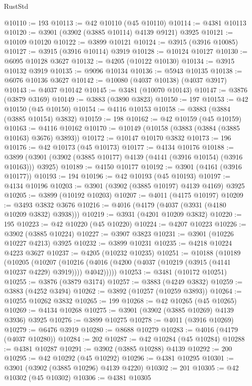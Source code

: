 \begin{lexlean}{RustStd}
\begin{coremodule}
@10110 := 193
@10113 := @42 @10110 (@45 @10110)
@10114 := @4381 @10113
@10120 := @3901 (@3902 (@3885 @10114) @4139 @9121) @3925
@10121 := @10109 @10120
@10122 := @3899 @10121
@10124 := @3915 (@3916 @10085)
@10127 := @3915 (@3916 @10114) @3919
@10128 := @10124 @10127
@10130 := @6095 @10128 @3627
@10132 := @4205 (@10122 @10130)
@10134 := @3915 @10132 @3919
@10135 := @9096 @10134
@10136 := @5943 @10135
@10138 := @6076 @10136 @3627
@10142 := @10080 (@4037 @10138) (@4037 @3917)
@10143 := @4037 @10142
@10145 := @3481 (@10070 @10143)
@10147 := @3876 (@3879 @3169)
@10149 := @3883 (@3890 @3823)
@10150 := 197
@10153 := @42 @10150 (@45 @10150)
@10154 := @4116 @10153
@10158 := @3883 (@3884 (@3885 @10154) @3832)
@10159 := 198
@10162 := @42 @10159 (@45 @10159)
@10163 := @4116 @10162
@10170 := @10149 (@10158 (@3883 (@3884 (@3885 @10163) @3676) @3893))
@10172 := @10147 @10170 @3832
@10173 := 196
@10176 := @42 @10173 (@45 @10173)
@10177 := @4134 @10176
@10188 := @3899 (@3901 (@3902 (@3885 @10177) @4139 (@4141 (@3916 @10154) (@3916 @10163))) @3925)
@10189 := @4150 @10177
@10192 := @3901 (@4161 (@3916 @10177))
@10193 := 194
@10196 := @42 @10193 (@45 @10193)
@10197 := @4134 @10196
@10203 := @3901 (@3902 (@3885 @10197) @4139 @4169) @3925
@10205 := @3899 (@10192 @10203)
@10207 := @4011 (@4175 @10197)
@10209 := @3493 @3832 @3676
@10216 := @4016 (@4179 (@4037 (@3931 (@4180 @10209 @3832) @3938)))
@10219 := @3931 (@4201 @10209 @3832)
@10220 := 195
@10223 := @42 @10220 (@45 @10220)
@10224 := @4207 @10223
@10226 := @3902 (@3885 @10224)
@10227 := @3907 @3823
@10231 := @3901 (@10226 @10227 @4213) @3925
@10232 := @3899 @10231
@10235 := @4218 @10224 @4223 @3627
@10237 := @4205 (@10232 @10235)
@10251 := @10188
    (@10189
      (@10205
        (@10207
          (@10216 (@4016 (@4200 (@4037 (@10219 (@3915 (@4141 @10237 @4229) @3919)))) @4042)))))
@10253 := @3481 (@10172 @10251)
@10255 := @3876 (@3879 @3174)
@10257 := @3883 (@4249 @3832)
@10259 := @3883 (@4252 @3494)
@10262 := @3892 (@10257 (@10259 @3893))
@10264 := @10255 @10262 @3832
@10265 := 199
@10268 := @42 @10265 (@45 @10265)
@10269 := @4134 @10268
@10275 := @3901 (@3902 (@3885 @10269) @4139 @3936) @3925
@10276 := @3899 @10275
@10278 := @4011 (@3916 @10269)
@10279 := @6476 @3919
@10280 := @8688 @10279
@10283 := @4016 (@4179 (@4037 @10280))
@10284 := 202
@10287 := @42 @10284 (@45 @10284)
@10288 := @4381 @10287
@10291 := @3902 (@3885 @10288) @4139
@10292 := 200
@10295 := @42 @10292 (@45 @10292)
@10296 := @4381 @10295
@10301 := @3901 (@3902 (@3885 @10296) @4139 @4220)
@10302 := 201
@10305 := @42 @10302 (@45 @10302)
@10306 := @4381 @10305

\end{coremodule}
\end{lexlean}
